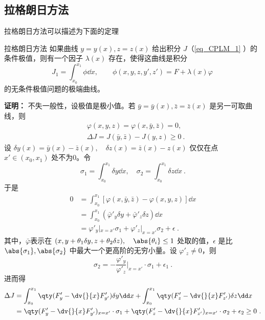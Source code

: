 \subsection{拉格朗日方法}
拉格朗日方法可以描述为下面的定理
\begin{theorem}{拉格朗日方法}
如果曲线 $y=y(x),z=z(x)$ 给出积分 $J$（\autoref{eq_CPLM_1} ）的条件极值，则有一个因子 $\lambda(x)$ 存在，使得这曲线是积分
\begin{equation}\label{eq_CPLM_4}
J_1=\int_{x_0}^{x_1}\phi \dd x,\qquad \phi(x,y,z,y',z')=F+\lambda(x)\varphi~
\end{equation}
的无条件极值问题的极端曲线。
\end{theorem}
\textbf{证明：}
不失一般性，设极值是极小值。若 $\bar y=\bar y(x),\bar z=\bar z(x)$ 是另一可取曲线，则
\begin{equation}
\begin{aligned}
&\varphi(x,y,z)=\varphi(x,\bar y,\bar z)=0,\\
&\Delta J=J(\bar y,\bar z)-J(y,z)\geq0~.
\end{aligned}
\end{equation}
设 $\delta y(x)=\bar y(x)-\bar z(x),\quad\delta z(x)=\bar z(x)-z(x)$ 仅仅在点 $x'\in (x_0,x_1)$ 处不为0。令
\begin{equation}
\sigma_1=\int_{x_0}^{x_1}\delta y\dd x,\quad \sigma_2=\int_{x_0}^{x_1}\delta z\dd x~.
\end{equation}
于是
\begin{equation}
\begin{aligned}
0&=\int_{x_0}^{x_1}[\varphi(x,\bar y,\bar z)-\varphi(x,y,z)]\dd x\\
&=\int_{x_0}^{x_1}(\bar\varphi'_y\delta y+\bar\varphi'_z\delta z)\dd x\\
&=\varphi'_y|_{x=x'}\sigma_1+\varphi'_z|_{x=x'}\sigma_2+\epsilon~.
\end{aligned}
\end{equation}
其中，$\bar\varphi$表示在 $(x,y+\theta_1\delta y,z+\theta_2\delta z),\quad \abs{\theta_i}\leq 1$ 处取的值，$\epsilon$ 是比 $\abs{\sigma_1},\abs{\sigma_2}$ 中最大一个更高阶的无穷小量。设 $\varphi'_z\neq0$，则
\begin{equation}\label{eq_CPLM_2}
\sigma_2=-\frac{\varphi'_y}{\varphi'_z}\Big|_{x=x'}\cdot\sigma_1+\epsilon_1~.
\end{equation}
进而得
\begin{equation}\label{eq_CPLM_3}
\begin{aligned}
\Delta J&=\int_{x_0}^{x_1}\qty(F'_y-\dv{}{x}F'_{y'})\delta y\dd x+\int_{x_0}^{x_1}\qty(F'_z-\dv{}{x}F'_{z'})\delta z\dd x\\
&=\qty(F'_y-\dv{}{x}F'_{y'})_{x=x'}\cdot\sigma_1+\qty(F'_z-\dv{}{x}F'_{z'})_{x=x'}\cdot\sigma_2+\epsilon_2\geq0~.
\end{aligned}
\end{equation}
